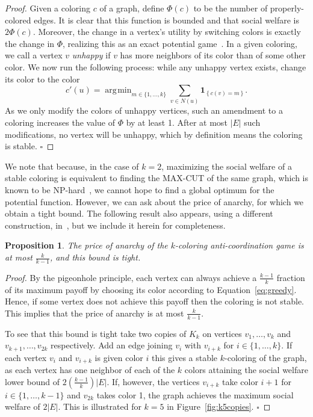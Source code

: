 \documentclass{llncs}
\newcommand{\ind}[1]{\textbf{1}_{\left \{ #1 \right \}}}
\newtheorem{propn}{Proposition}
\DeclareMathOperator*{\argmin}{\arg\!\min}
\begin{document}
\begin{proof}
Given a coloring $c$ of a graph, define $\Phi(c)$ to be the number of 
properly-colored edges. It is clear that this function is bounded and that
social welfare is $2 \Phi(c)$. Moreover, the change in a vertex's utility by
switching colors is exactly the change in $\Phi$, realizing this as an exact
potential game~\cite{M96}. In a given coloring, we call a vertex $v$ \emph{unhappy} if $v$
has more neighbors of its color than of some other color.  We now run the
following process: while any unhappy vertex exists, change its color to the
color
\begin{equation}\label{eq:greedy}
c'(u) = \argmin_{m \in \{1, \ldots, k\}} \sum_{ v \in N(u)}\ind{c(v) = m}.
\end{equation}
As we only modify the colors of unhappy vertices, such an amendment to a
coloring increases the value of $\Phi$ by at least 1. After at most $|E|$
such modifications, no vertex will be unhappy, which by definition means the
coloring is stable. \hfill $\square$
\end{proof}

We note that because, in the case of $k=2$, maximizing the social welfare of a
stable coloring is equivalent to finding the MAX-CUT of the same graph, which
is known to be NP-hard~\cite{GareyJ79}, we cannot hope to find a global optimum
for the potential function.  However, we can ask about the price of anarchy, for
which we obtain a tight bound.  The following result also appears, using
a different construction, in~\cite{Hoefer2007}, but we include it herein for completeness.

\begin{propn}\label{obs:poa}
The price of anarchy of the $k$-coloring anti-coordination game is at most
$\frac{k}{k-1}$, and this bound is tight.
\end{propn}

\begin{proof}
By the pigeonhole principle, each vertex can always achieve a $\frac{k-1}{k}$
fraction of its maximum payoff by choosing its color according to
Equation~\ref{eq:greedy}.  Hence, if some vertex does not achieve this payoff
then the coloring is not stable.  This implies that the price of anarchy is at
most $\frac{k}{k-1}$.

To see that this bound is tight take two copies of $K_k$ on vertices $v_1,
\dots, v_k$ and $v_{k+1}, \dots, v_{2k}$ respectively. Add an edge joining
$v_i$ with $v_{i+k}$ for $i\in \{1,\dots,k\}$. If each vertex $v_i$ and
$v_{i+k}$ is given color $i$ this gives a stable $k$-coloring of the graph, as
each vertex has one neighbor of each of the $k$ colors attaining the social
welfare lower bound of $2(\frac{k-1}{k})|E|$. If, however, the vertices
$v_{i+k}$ take color $i+1$ for $i\in\{1,\dots,k-1\}$ and $v_{2k}$ takes color
1, the graph achieves the maximum social welfare of $2|E|$.  This is
illustrated for $k=5$ in Figure~\ref{fig:k5copies}.
\hfill
$\square$\end{proof}
\end{document}
